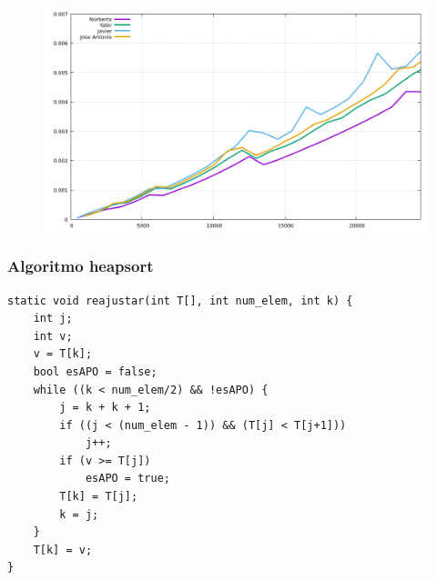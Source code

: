 \documentclass[spanish]{beamer}
\begin{document}
\begin{frame}
    \begin{figure}[H]
    \centering   
        \includegraphics[clip,width=1\columnwidth]{../plots/mergesort}%
    \end{figure}
\end{frame}

\begin{frame}\frametitle{Algoritmo heapsort}

  \begin{lstlisting}
static void reajustar(int T[], int num_elem, int k) {
	int j;
	int v;
	v = T[k];
	bool esAPO = false;
	while ((k < num_elem/2) && !esAPO) {
		j = k + k + 1;
		if ((j < (num_elem - 1)) && (T[j] < T[j+1]))
			j++;
		if (v >= T[j])
			esAPO = true;
		T[k] = T[j];
		k = j;
	}
	T[k] = v;
}
\end{lstlisting}
  
\end{frame}
 
\end{document}
